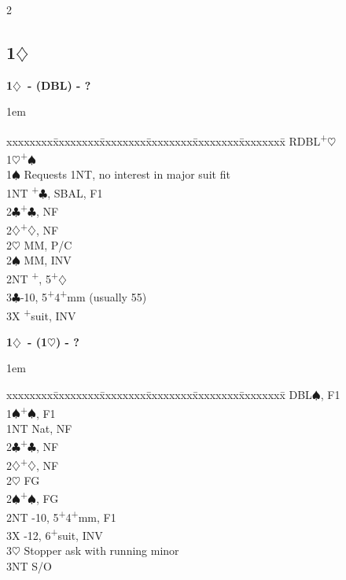 \documentclass[10pt]{article}
\renewcommand{\c}{$\clubsuit$}
\renewcommand{\d}{$\diamondsuit$}
\newcommand{\h}{$\heartsuit$}
\newcommand{\s}{$\spadesuit$}
\newcommand{\p}{\textsuperscript{+}}
\newcommand{\x}{DBL}
\newcommand{\xx}{RDBL}
\newenvironment{bidtable}[1][]
{\textbf{#1}
  \begin{adjustwidth}{1em}{}
    \addvspace{2pt}
    \begin{tabbing}
      xxxxxxxx\=xxxxxxxx\=xxxxxxxx\=xxxxxxxx\=xxxxxxxx\=xxxxxxxx\=\kill}
{\end{tabbing}\end{adjustwidth}\bigskip}%
\newcommand{\pdfd}{\texorpdfstring{\d{}}{D}}
\begin{document}
\begin{multicols*}{2}
\subsection{1\pdfd}

\begin{bidtable}[1\d\ - (\x) - ?]
\xx  {}\p\h                                       \\
1\h {}\p\s                                       \\
1\s \> Requests 1NT, no interest in major suit fit \\
1NT \p\c, SBAL, F1                             \\
2\c {}\p\c, NF                                   \\
2\d {}\p\d, NF                                   \\
2\h {} MM, P/C                                  \\
2\s {} MM, INV                                  \\
2NT \p, 5\p\d                                 \\
3\c {}-10, 5\p4\p mm (usually 55)                \\
3X  \p suit, INV                               \\
\end{bidtable}

\begin{bidtable}[1\d\ - (1\h) - ?]
\x  {}\s, F1                        \\
1\s {}\p\s, F1                      \\
1NT \> Nat, NF                        \\
2\c {}\p\c, NF                      \\
2\d {}\p\d, NF                      \\
2\h \> FG                             \\
2\s {}\p\s, FG                      \\
2NT -10, 5\p4\p mm, F1                \\
3X  -12, 6\p suit, INV            \\
3\h \> Stopper ask with running minor \\
3NT \> S/O                            \\
\end{bidtable}


\end{multicols*}
\end{document}
